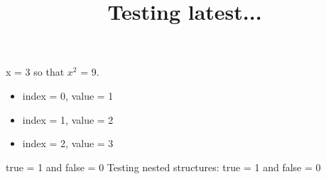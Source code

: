 \documentclass{article}
\title{Testing latest...}
\begin{document}
x = 3 so that $x^2$ = 9.
\begin{itemize}
\item index = 0, value = 1
\item index = 1, value = 2
\item index = 2, value = 3
\end{itemize}
true = 1 and false = 0
Testing nested structures:
true = 1 and false = 0
\end{document}
